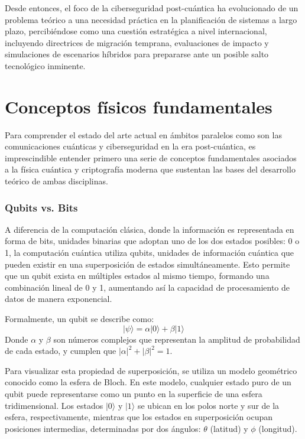 Desde entonces, el foco de la ciberseguridad post-cuántica ha evolucionado de
un problema teórico a una necesidad práctica en la planificación de sistemas a
largo plazo, percibiéndose como una cuestión estratégica a nivel internacional,
incluyendo directrices de migración temprana, evaluaciones de impacto y simulaciones
de escenarios híbridos para prepararse ante un posible salto tecnológico
inminente.

\section{Conceptos físicos fundamentales}

Para comprender el estado del arte actual en ámbitos paralelos como son las
comunicaciones cuánticas y ciberseguridad en la era post-cuántica, es
imprescindible entender primero una serie de conceptos fundamentales asociados
a la física cuántica y criptografía moderna que sustentan las bases del
desarrollo teórico de ambas disciplinas.

\subsubsection{Qubits vs. Bits}
A diferencia de la computación clásica, donde la información es
representada en forma de bits, unidades binarias que adoptan uno de los dos
estados posibles: 0 o 1, la computación cuántica utiliza qubits, unidades de
información cuántica que pueden existir en una superposición de estados
simultáneamente. Esto permite que un qubit exista en múltiples estados al mismo
tiempo, formando una combinación lineal de 0 y 1, aumentando así la capacidad
de procesamiento de datos de manera exponencial.

Formalmente, un qubit se describe como:
$$ |\psi\rangle = \alpha|0\rangle + \beta|1\rangle $$
Donde $\alpha$ y $\beta$ son números complejos que representan la amplitud de probabilidad de cada
estado, y cumplen que $|\alpha|^2 + |\beta|^2 = 1$.

Para visualizar esta propiedad de superposición, se utiliza un modelo
geométrico conocido como la esfera de Bloch. En este modelo, cualquier
estado puro de un qubit puede representarse como un punto en la superficie de
una esfera tridimensional. Los estados $|0\rangle$ y $|1\rangle$ se ubican en los
polos norte y sur de la esfera, respectivamente, mientras que los estados en
superposición ocupan posiciones intermedias, determinadas por dos ángulos: $\theta$ (latitud) y $\phi$ (longitud).

